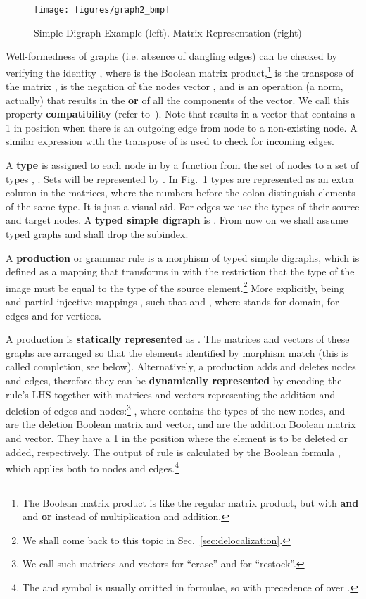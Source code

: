 \documentclass{fundam}
\begin{document}
\begin{figure}[htbp]
  \centering
  \texttt{[image: figures/graph2\_bmp]}
  \caption{Simple Digraph Example (left). Matrix Representation
    (right)}
  \label{fig:example_graph}
\end{figure}


Well-formedness of graphs (i.e. absence of dangling edges) can be
checked by verifying the identity , where  is the Boolean
matrix product,\footnote{The Boolean matrix product is like the regular
  matrix product, but with \textbf{and} and \textbf{or} instead of
  multiplication and addition.}  is the transpose of the matrix
,  is the negation of the nodes vector , and  is an operation (a norm, actually) that results in the
{\bf or} of all the components of the vector. We call this property
\textbf{compatibility} (refer to~\cite{JuanPP_1}). Note that  results in a vector that contains a 1 in position 
when there is an outgoing edge from node  to a non-existing node. A
similar expression with the transpose of  is used to check for
incoming edges.


A \textbf{type} is assigned to each node in  by a function
from the set of nodes  to a set of types ,
. Sets will be represented by . In
Fig.~\ref{fig:example_graph} types are represented as an extra column
in the matrices, where the numbers before the colon distinguish
elements of the same type. It is just a visual aid. For edges we use
the types of their source and target nodes. A \textbf{typed simple
  digraph} is . From now on we shall assume typed
graphs and shall drop the  subindex.

A \textbf{production} or grammar rule  is a
morphism of typed simple digraphs, which is defined as a mapping that
transforms  in  with the restriction that the type of the image
must be equal to the type of the source element.\footnote{We shall
  come back to this topic in Sec.~\ref{sec:delocalization}.} More
explicitly,  being  and 
partial injective mappings ,
 such that  and , where  stands for
domain,  for edges and  for vertices.


A production  is \textbf{statically represented} as
. The matrices and vectors of these graphs are arranged so
that the elements identified by morphism  match (this is called
completion, see below). Alternatively, a production adds and deletes
nodes and edges, therefore they can be \textbf{dynamically represented}
by encoding the rule's LHS together with matrices and vectors
representing the addition and deletion of edges and nodes:\footnote{We
  call such matrices and vectors  for ``erase'' and  for
  ``restock''.} , where 
contains the types of the new nodes,  and  are the deletion
Boolean matrix and vector,  and  are the addition Boolean
matrix and vector. They have a 1 in the position where the element is
to be deleted or added, respectively. The output of rule  is
calculated by the Boolean formula , which applies both to nodes and edges.\footnote{The and symbol
   is usually omitted in formulae, so  with precedence of  over .}
\end{document}
